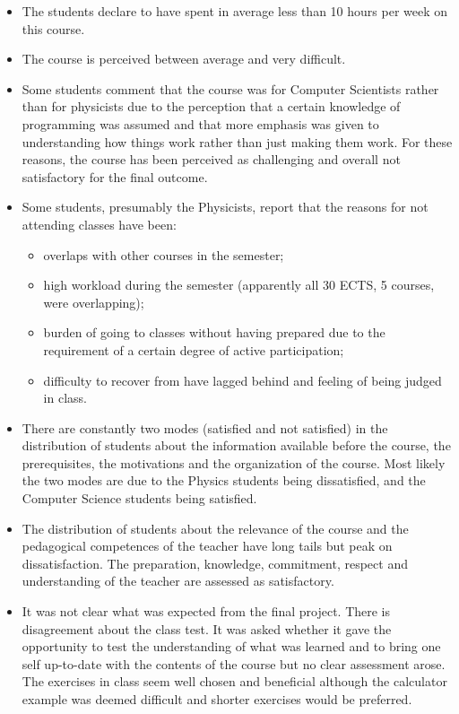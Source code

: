 \documentclass[11pt]{article}
\begin{document}
\begin{itemize}
\item The students declare to have spent in average less than 10 hours
  per week on this course.

\item The course is perceived between average and very difficult.

\item Some students comment that the course was for Computer
  Scientists rather than for physicists due to the perception that a
  certain knowledge of programming was assumed and that more emphasis
  was given to understanding how things work rather than just making
  them work. For these reasons, the course has been perceived as
  challenging and overall not satisfactory for the final outcome.

\item Some students, presumably the Physicists, report that the reasons
  for not attending classes have been:
  \begin{itemize}
  \item overlaps with other courses in the semester;
\item high workload during the semester (apparently all 30 ECTS, 5 courses,
  were overlapping);
\item burden of going to classes without having prepared due to the
  requirement of a certain degree of active participation;
\item difficulty to recover from have lagged behind and feeling of being judged
  in class.
\end{itemize}

\item There are constantly two modes (satisfied and not satisfied) in the
distribution of students about the information available before the
course, the prerequisites, the motivations and the organization of the course. Most
likely the two modes are due to the Physics students being
dissatisfied, and the Computer Science students being satisfied.

\item The distribution of students about the relevance of the course
  and the pedagogical competences of the teacher have long tails but
  peak on dissatisfaction. The preparation, knowledge, commitment,
  respect and understanding of the teacher are assessed as
  satisfactory.

\item It was not clear what was expected from the final project. There is
disagreement about the class test. It was asked whether it gave the
opportunity to test the understanding of what was learned and to bring
one self up-to-date with the contents of the course but no clear
assessment arose. The exercises in class seem well chosen and
beneficial although the calculator example was deemed  difficult and
shorter exercises would be preferred.


\end{itemize}
\end{document}

